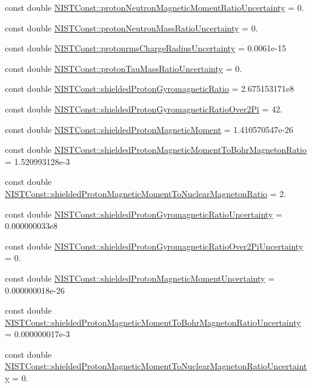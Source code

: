 \begin{DoxyCompactItemize}
\item 
const double \hyperlink{group___proton_ga2bef48ff6e07b2fd601818189686aac0}{N\+I\+S\+T\+Const\+::proton\+Neutron\+Magnetic\+Moment\+Ratio\+Uncertainty} = 0.
\item 
const double \hyperlink{group___proton_ga722d9bfcefc00b2a9c4e40ffbb689518}{N\+I\+S\+T\+Const\+::proton\+Neutron\+Mass\+Ratio\+Uncertainty} = 0.
\item 
const double \hyperlink{group___proton_ga0c56798c5c24948626558522705c2440}{N\+I\+S\+T\+Const\+::protonrms\+Charge\+Radius\+Uncertainty} = 0.\+0061e-\/15
\item 
const double \hyperlink{group___proton_ga902ba548a0c988ed1dec5a82a4126da5}{N\+I\+S\+T\+Const\+::proton\+Tau\+Mass\+Ratio\+Uncertainty} = 0.
\item 
const double \hyperlink{group___proton_ga2affce442da8b445cce1c580b41bbd82}{N\+I\+S\+T\+Const\+::shielded\+Proton\+Gyromagnetic\+Ratio} = 2.\+675153171e8
\item 
const double \hyperlink{group___proton_ga5b2d223ede8fc141af04cef0486c2c52}{N\+I\+S\+T\+Const\+::shielded\+Proton\+Gyromagnetic\+Ratio\+Over2\+Pi} = 42.
\item 
const double \hyperlink{group___proton_ga3e2c09881642d47d3e869c7803862e6f}{N\+I\+S\+T\+Const\+::shielded\+Proton\+Magnetic\+Moment} = 1.\+410570547e-\/26
\item 
const double \hyperlink{group___proton_ga175eb518370bc31471e8ad763e760b72}{N\+I\+S\+T\+Const\+::shielded\+Proton\+Magnetic\+Moment\+To\+Bohr\+Magneton\+Ratio} = 1.\+520993128e-\/3
\item 
const double \hyperlink{group___proton_ga03e84ef0d1452fa7c647f8866913fbc3}{N\+I\+S\+T\+Const\+::shielded\+Proton\+Magnetic\+Moment\+To\+Nuclear\+Magneton\+Ratio} = 2.
\item 
const double \hyperlink{group___proton_gae603375639410bab3920a82ad88e22b8}{N\+I\+S\+T\+Const\+::shielded\+Proton\+Gyromagnetic\+Ratio\+Uncertainty} = 0.\+000000033e8
\item 
const double \hyperlink{group___proton_ga8a726ae1ce4a083a50cd2bb5c446cf15}{N\+I\+S\+T\+Const\+::shielded\+Proton\+Gyromagnetic\+Ratio\+Over2\+Pi\+Uncertainty} = 0.
\item 
const double \hyperlink{group___proton_gafe8c348ee7683aa218402bf235838fbf}{N\+I\+S\+T\+Const\+::shielded\+Proton\+Magnetic\+Moment\+Uncertainty} = 0.\+000000018e-\/26
\item 
const double \hyperlink{group___proton_ga4dc5506090e7cff7b2507713994e986d}{N\+I\+S\+T\+Const\+::shielded\+Proton\+Magnetic\+Moment\+To\+Bohr\+Magneton\+Ratio\+Uncertainty} = 0.\+000000017e-\/3
\item 
const double \hyperlink{group___proton_ga26b2c035f1b78ca42fc9340314e5a106}{N\+I\+S\+T\+Const\+::shielded\+Proton\+Magnetic\+Moment\+To\+Nuclear\+Magneton\+Ratio\+Uncertainty} = 0.
\end{DoxyCompactItemize}


